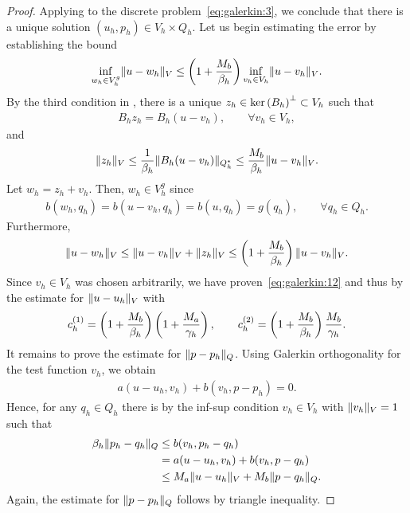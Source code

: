 \begin{proof}
  Applying  to the discrete
  problem~\eqref{eq:galerkin:3}, we conclude that there is a unique
  solution $(u_h,p_h)\in V_h\times Q_h$. Let us begin estimating the
  error by establishing the bound
  \begin{gather}
    \label{eq:galerkin:12}
    \inf_{w_h\in V_h^g} \lVert u-w_h\rVert_V
    \le \left(1+\frac{M_b}{\beta_h}\right)
    \inf_{v_h\in V_h} \lVert u-v_h\rVert_V.
  \end{gather}
  By the third condition in
  , there is a unique
  $z_h\in {\operatorname{ker}\left(B_h\right)}^\perp \subset V_h$ such that
  \begin{gather}
    B_h z_h = B_h(u-v_h),\qquad \forall v_h\in V_h,
  \end{gather}
  and
  \begin{gather}
    \lVert z_h\rVert_V \le \frac1{\beta_h}\lVert B_h(u-v_h)\rVert_{Q_h^*}
    \le\frac{M_b}{\beta_h} \lVert u-v_h\rVert_V.
  \end{gather}
  Let $w_h = z_h+v_h$. Then, $w_h\in V_h^g$ since
  \begin{gather}
    b(w_h, q_h) = b(u-v_h, q_h) = b(u, q_h) = g(q_h),
    \qquad\forall q_h\in Q_h.
  \end{gather}
  Furthermore,
  \begin{gather}
    \lVert u-w_h\rVert_V \le \lVert u-v_h\rVert_V + \lVert z_h\rVert_V
    \le \left(1+\frac{M_b}{\beta_h}\right)
    \lVert u-v_h\rVert_V.
  \end{gather}
  Since $v_h \in V_h$ was chosen arbitrarily, we have
  proven~\eqref{eq:galerkin:12} and thus by
   the estimate for
  $\lVert u-u_h\rVert_V$ with
  \begin{gather}
    c_h^{(1)} = \left(1+\frac{M_b}{\beta_h}\right)
    \left(1+\frac{M_a}{\gamma_h}\right),
    \qquad
    c_h^{(2)} = \left(1+\frac{M_b}{\beta_h}\right)
    \frac{M_b}{\gamma_h}.
  \end{gather}
  It remains to prove the estimate for $\lVert p-p_h\rVert_Q$. Using Galerkin
  orthogonality for the test function $v_h$, we obtain
  \begin{gather}
    \label{eq:galerkin:13}
    a(u-u_h, v_h) + b(v_h, p-p_h) = 0.
  \end{gather}
  Hence, for any $q_h\in Q_h$ there is by the inf-sup condition
  $v_h\in V_h$ with $\lVert v_h\rVert_V=1$ such that
  \begin{align}
    \beta_h \lVert p_h-q_h\rVert_Q
    &\le b(v_h, p_h-q_h)\\
    & = a(u-u_h, v_h) + b(v_h, p-q_h)\\
    &\le M_a \lVert u-u_h\rVert_V + M_b \lVert p-q_h\rVert_Q.
  \end{align}
  Again, the estimate for $\lVert p-p_h\rVert_Q$ follows by triangle
  inequality.
\end{proof}

